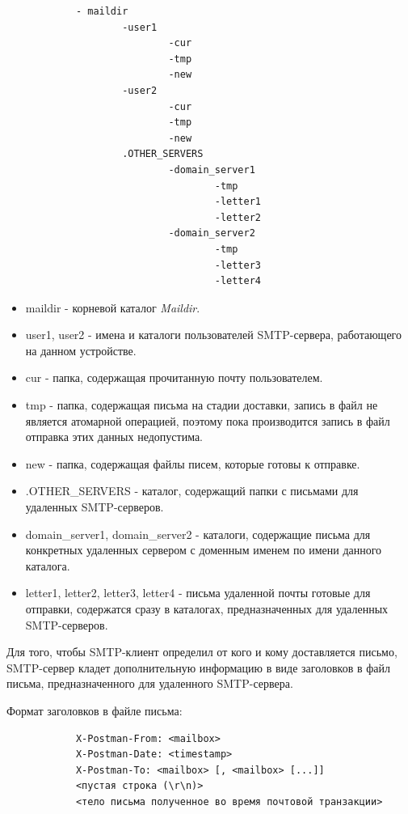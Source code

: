 \documentclass[a4paper,12pt]{report}
\begin{document}
    	\begin{verbatim}
        	- maildir
                	-user1
                        	-cur
                        	-tmp
                        	-new
                	-user2
                        	-cur
                        	-tmp
                        	-new
                	.OTHER_SERVERS
                        	-domain_server1
                                	-tmp
                                	-letter1
                                	-letter2
                        	-domain_server2
                                	-tmp
                                	-letter3
                                	-letter4
    	\end{verbatim}

	\begin{itemize}
		\item maildir - корневой каталог \textit{Maildir}.
		\item user1, user2 - имена и каталоги пользователей SMTP-сервера, работающего на данном устройстве.
		\item cur - папка, содержащая прочитанную почту пользователем.
		\item tmp - папка, содержащая письма на стадии доставки, запись в файл не является атомарной операцией, поэтому пока производится запись в файл отправка этих данных недопустима.
		\item new - папка, содержащая файлы писем, которые готовы к отправке.
		\item .OTHER\_SERVERS - каталог, содержащий папки с письмами для удаленных SMTP-серверов.
		\item domain\_server1, domain\_server2 - каталоги, содержащие письма для конкретных удаленных сервером с доменным именем по имени данного каталога.
		\item letter1, letter2, letter3, letter4 - письма удаленной почты готовые для отправки, содержатся сразу в каталогах, предназначенных для удаленных SMTP-серверов.
	\end{itemize}

	Для того, чтобы SMTP-клиент определил от кого и кому доставляется письмо, SMTP-сервер кладет дополнительную информацию в виде заголовков в файл письма, предназначенного для удаленного SMTP-сервера.
	
	Формат заголовков в файле письма:
	\begin{verbatim}
        	X-Postman-From: <mailbox>
        	X-Postman-Date: <timestamp>
        	X-Postman-To: <mailbox> [, <mailbox> [...]]
        	<пустая строка (\r\n)>
        	<тело письма полученное во время почтовой транзакции>
    	\end{verbatim}
    
\end{document}
